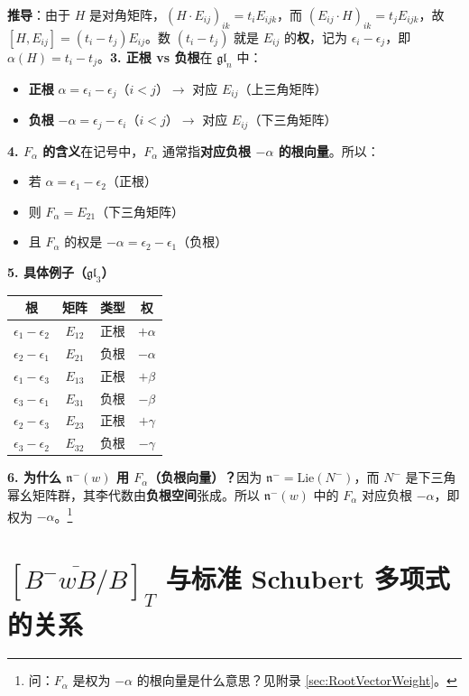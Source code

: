 \textbf{推导}：由于 $H$ 是对角矩阵，$(H \cdot E_{ij})_{ik} = t_i E_{ijk}$，而 $(E_{ij} \cdot H)_{ik} = t_j E_{ijk}$，故 $[H, E_{ij}] = (t_i - t_j) E_{ij}$。数 $(t_i - t_j)$ 就是 $E_{ij}$ 的\textbf{权}，记为 $\epsilon_i - \epsilon_j$，即 $\alpha(H) = t_i - t_j$。\textbf{3. 正根 vs 负根}在 $\mathfrak{gl}_n$ 中：
\begin{itemize}
\item \textbf{正根} $\alpha = \epsilon_i - \epsilon_j$（$i < j$）$\rightarrow$ 对应 $E_{ij}$（上三角矩阵）\item \textbf{负根} $-\alpha = \epsilon_j - \epsilon_i$（$i < j$）$\rightarrow$ 对应 $E_{ij}$（下三角矩阵）
\end{itemize}

\textbf{4. $F_\alpha$ 的含义}在记号中，$F_\alpha$ 通常指\textbf{对应负根 $-\alpha$ 的根向量}。所以：
\begin{itemize}
\item 若 $\alpha = \epsilon_1 - \epsilon_2$（正根）\item 则 $F_\alpha = E_{21}$（下三角矩阵）\item 且 $F_\alpha$ 的权是 $-\alpha = \epsilon_2 - \epsilon_1$（负根）
\end{itemize}

\textbf{5. 具体例子（$\mathfrak{gl}_3$）}
\begin{center}
\begin{tabular}{cccc}根 & 矩阵 & 类型 & 权 \\ \hline$\epsilon_1 - \epsilon_2$ & $E_{12}$ & 正根 & $+\alpha$ \\$\epsilon_2 - \epsilon_1$ & $E_{21}$ & 负根 & $-\alpha$ \\$\epsilon_1 - \epsilon_3$ & $E_{13}$ & 正根 & $+\beta$ \\$\epsilon_3 - \epsilon_1$ & $E_{31}$ & 负根 & $-\beta$ \\$\epsilon_2 - \epsilon_3$ & $E_{23}$ & 正根 & $+\gamma$ \\$\epsilon_3 - \epsilon_2$ & $E_{32}$ & 负根 & $-\gamma$
\end{tabular}
\end{center}\textbf{6. 为什么 $\mathfrak{n}^-(w)$ 用 $F_\alpha$（负根向量）？}因为 $\mathfrak{n}^- = \mathrm{Lie}(N^-)$，而 $N^-$ 是下三角幂幺矩阵群，其李代数由\textbf{负根空间}张成。所以 $\mathfrak{n}^-(w)$ 中的 $F_\alpha$ 对应负根 $-\alpha$，即权为 $-\alpha$。\footnote{问：$F_\alpha$ 是权为 $-\alpha$ 的根向量是什么意思？见附录 \cref{sec:RootVectorWeight}。}
\section{$[\overline{B^-wB/B}]_T$ 与标准 Schubert 多项式的关系}\label{sec:EquivariantClassVsSchubert}
